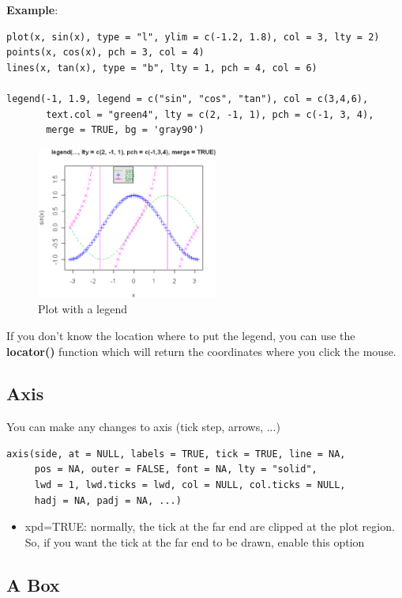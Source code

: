 {\bf Example}:
\begin{lstlisting}
plot(x, sin(x), type = "l", ylim = c(-1.2, 1.8), col = 3, lty = 2)
points(x, cos(x), pch = 3, col = 4)
lines(x, tan(x), type = "b", lty = 1, pch = 4, col = 6)

legend(-1, 1.9, legend = c("sin", "cos", "tan"), col = c(3,4,6),
       text.col = "green4", lty = c(2, -1, 1), pch = c(-1, 3, 4),
       merge = TRUE, bg = 'gray90')
\end{lstlisting}

\begin{figure}[hbt]
 \centerline{\includegraphics[height=5cm]{./images/legend.eps}}
\caption{Plot with a legend}
\label{fig:legend}
\end{figure}

If you don't know the location where to put the legend, you can use
the {\bf locator()} function which will return the coordinates where
you click the mouse. 

\subsection{Axis}
\label{sec:axis}

You can make any changes to axis (tick step, arrows, ...)
\begin{lstlisting}
axis(side, at = NULL, labels = TRUE, tick = TRUE, line = NA,
     pos = NA, outer = FALSE, font = NA, lty = "solid",
     lwd = 1, lwd.ticks = lwd, col = NULL, col.ticks = NULL,
     hadj = NA, padj = NA, ...)
\end{lstlisting}


\begin{itemize}
\item xpd=TRUE: normally, the tick at the far end are clipped at the plot region. So, if you want the tick at the far end to be drawn, enable this option
\end{itemize}

\subsection{A Box}
\label{sec:box}

